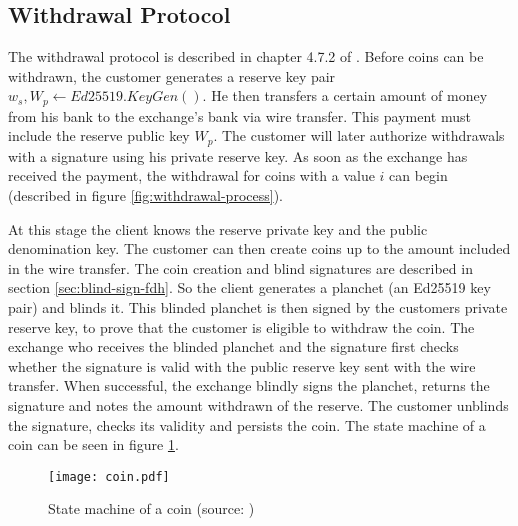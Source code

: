 \subsection{Withdrawal Protocol}
\label{sec:withdrawal}
The withdrawal protocol is described in chapter 4.7.2 of \cite{dold:the-gnu-taler-system}.
Before coins can be withdrawn, the customer generates a reserve key pair $ w_s, W_p \leftarrow Ed25519.KeyGen() $.
He then transfers a certain amount of money from his bank to the exchange's bank via wire transfer.
This payment must include the reserve public key $ W_p $.
The customer will later authorize withdrawals with a signature using his private reserve key.
As soon as the exchange has received the payment, the withdrawal for coins with a value $ i $ can begin (described in figure \ref{fig:withdrawal-process}).

At this stage the client knows the reserve private key and the public denomination key.
The customer can then create coins up to the amount included in the wire transfer.
The coin creation and blind signatures are described in section \ref{sec:blind-sign-fdh}.
So the client generates a planchet (an Ed25519 key pair) and blinds it.
This blinded planchet is then signed by the customers private reserve key, to prove that the customer is eligible to withdraw the coin.
The exchange who receives the blinded planchet and the signature first checks whether the signature is valid with the public reserve key sent with the wire transfer.
When successful, the exchange blindly signs the planchet, returns the signature and notes the amount withdrawn of the reserve.
The customer unblinds the signature, checks its validity and persists the coin.
The state machine of a coin can be seen in figure \ref{fig:coin:states}.

\begin{figure}[htp]
    \begin{center}
        \texttt{[image: coin.pdf]}
    \end{center}
    \caption{State machine of a coin (source: \cite{pic:coin-state-machine})}
    \label{fig:coin:states}
\end{figure}

